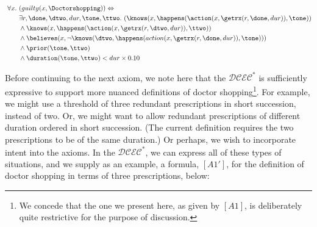 
\begin{footnotesize}
\begin{align*}
[A1] \ \forall x . \ &(guilty(x, \Doctorshopping)) \Leftrightarrow \\
	& \exists r, \done, \dtwo, dur, \tone, \ttwo . \ (\knows(x,\happens(\action(x, \getrx(r, \done, dur)), \tone)) \\
	& \wedge \knows(x,\happens(\action(x,\getrx(r,\dtwo,dur)),\ttwo)) \\
	& \wedge \believes(x,\neg\knows(\dtwo,\happens(action(x,\getrx(r,\done,dur)),\tone))) \\
	& \wedge \prior(\tone, \ttwo) \\
	& \wedge \duration(\tone, \ttwo) < dur \times 0.10
\end{align*}
\end{footnotesize}

Before continuing to the next axiom, we note here that the $\mathcal{DCEC}^\ast$ is sufficiently expressive to support more nuanced definitions of doctor shopping\footnote{We concede that the one we present here, as given by $[A1]$, is deliberately quite restrictive for the purpose of discussion.}.  For example, we might use a threshold of three redundant prescriptions in short succession, instead of two.  Or, we might want to allow redundant prescriptions of different duration ordered in short succession. (The current definition requires the two prescriptions to be of the same duration.)  Or perhaps, we wish to incorporate intent into the axioms.  In the $\mathcal{DCEC}^\ast$, we can express all of these types of situations, and we supply as an example, a formula, $[A1']$, for the definition of doctor shopping in terms of three prescriptions, below:

